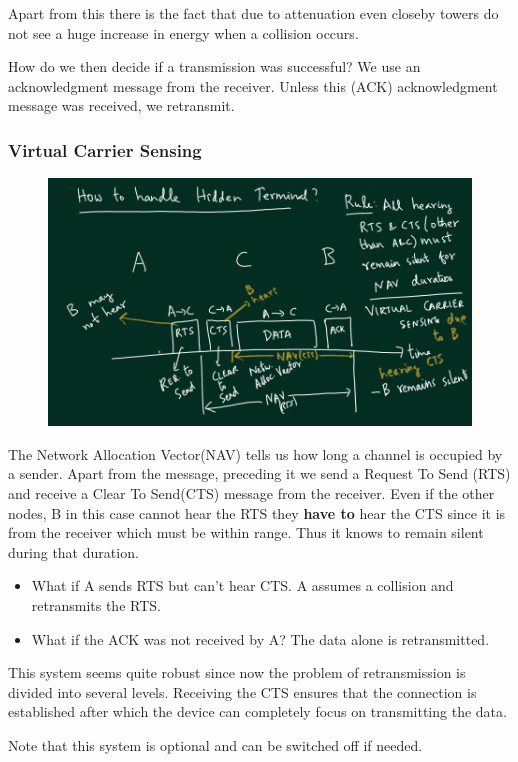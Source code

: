 \documentclass[12pt]{article}
\begin{document}
Apart from this there is the fact that due to attenuation even closeby towers do not 
see a huge increase in energy when a collision occurs. 


How do we then decide if a transmission was successful? We use an acknowledgment message from the receiver. 
Unless this (ACK) acknowledgment message was received, we retransmit. 

\subsubsection{Virtual Carrier Sensing}

\begin{figure}[H]
    \centering
    \includegraphics*[width=15cm]{Diagrams/hidden_terminal.png}
\end{figure}

The Network Allocation Vector(NAV) tells us how long a channel is occupied by a sender. 
Apart from the message, preceding it we send a Request To Send (RTS) and receive a Clear To Send(CTS) message from the 
receiver. Even if the other nodes, B in this case cannot hear the RTS they \textbf{have to} hear the CTS since it is from the 
receiver which must be within range. Thus it knows to remain silent during that duration. 

\begin{itemize}
    \item What if A sends RTS but can't hear CTS. A assumes a collision and retransmits the RTS. 
    \item What if the ACK was not received by A? The data alone is retransmitted. 
\end{itemize}

This system seems quite robust since now the problem of retransmission is divided into several levels. Receiving the 
CTS ensures that the connection is established after which the device can completely focus on transmitting the data. 

Note that this system is optional and can be switched off if needed. 
\end{document}

